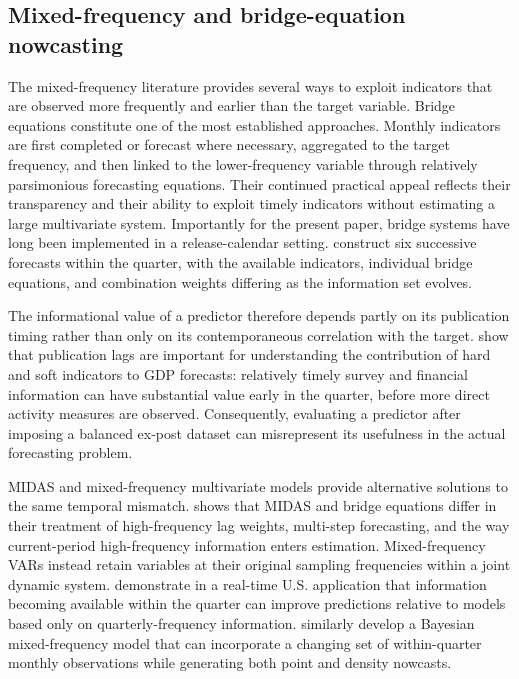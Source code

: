 \subsection{Mixed-frequency and bridge-equation nowcasting}
\label{subsec:lit_mixed_frequency}

The mixed-frequency literature provides several ways to exploit indicators that
are observed more frequently and earlier than the target variable. Bridge
equations constitute one of the most established approaches. Monthly indicators
are first completed or forecast where necessary, aggregated to the target
frequency, and then linked to the lower-frequency variable through relatively
parsimonious forecasting equations. Their continued practical appeal reflects
their transparency and their ability to exploit timely indicators without
estimating a large multivariate system. Importantly for the present paper,
bridge systems have long been implemented in a release-calendar setting.
\citet{drechselmaurin2011flow} construct six successive forecasts within the
quarter, with the available indicators, individual bridge equations, and
combination weights differing as the information set evolves.

The informational value of a predictor therefore depends partly on its
publication timing rather than only on its contemporaneous correlation with the
target. \citet{banbura2011blackbox} show that publication lags are important for
understanding the contribution of hard and soft indicators to GDP forecasts:
relatively timely survey and financial information can have substantial value
early in the quarter, before more direct activity measures are observed.
Consequently, evaluating a predictor after imposing a balanced ex-post dataset
can misrepresent its usefulness in the actual forecasting problem.

MIDAS and mixed-frequency multivariate models provide alternative solutions to
the same temporal mismatch. \citet{schumacher2016midasbridge} shows that MIDAS
and bridge equations differ in their treatment of high-frequency lag weights,
multi-step forecasting, and the way current-period high-frequency information
enters estimation. Mixed-frequency VARs instead retain variables at their
original sampling frequencies within a joint dynamic system.
\citet{schorfheide2015mixedfrequency} demonstrate in a real-time U.S. application
that information becoming available within the quarter can improve predictions
relative to models based only on quarterly-frequency information.
\citet{carriero2015realtime} similarly develop a Bayesian mixed-frequency model
that can incorporate a changing set of within-quarter monthly observations while
generating both point and density nowcasts.

